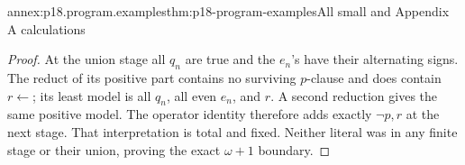 \begin{annexitem}{annex:p18.program.examples}{thm:p18-program-examples}{All small and Appendix A calculations}
\begin{proof}
At the union stage all \(q_n\)
are true and the \(e_n\)'s
have their alternating signs.
The reduct of its positive
part contains no surviving
\(p\)-clause and does contain
\(r\leftarrow\); its least
model is all \(q_n\), all
even \(e_n\), and \(r\).
A second reduction gives
the same positive model.
The operator identity therefore
adds exactly \(\neg p,r\)
at the next stage. That
interpretation is total and
fixed. Neither literal was
in any finite stage or
their union, proving the
exact \(\omega+1\) boundary.
\end{proof}
\end{annexitem}
